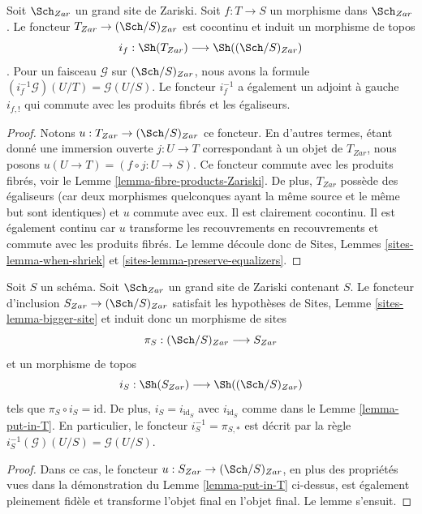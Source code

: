 \begin{lemma}
\label{lemma-put-in-T}
Soit $\Sch_{Zar}$ un grand site de Zariski. Soit $f : T \to S$ un morphisme dans $\Sch_{Zar}$. Le foncteur $T_{Zar} \to (\Sch/S)_{Zar}$ est cocontinu et induit un morphisme de topos
$$
i_f :
\Sh(T_{Zar})
\longrightarrow
\Sh((\Sch/S)_{Zar})
$$
. Pour un faisceau $\mathcal{G}$ sur $(\Sch/S)_{Zar}$, nous avons la formule\newline $(i_f^{-1}\mathcal{G})(U/T) = \mathcal{G}(U/S)$. Le foncteur $i_f^{-1}$ a également un adjoint à gauche $i_{f, !}$ qui commute avec les produits fibrés et les égaliseurs.
\end{lemma}

\begin{proof}
Notons $u : T_{Zar} \to (\Sch/S)_{Zar}$ ce foncteur. En d'autres termes, étant donné une immersion ouverte $j : U \to T$ correspondant à un objet de $T_{Zar}$, nous posons $u(U \to T) = (f \circ j : U \to S)$. Ce foncteur commute avec les produits fibrés, voir le Lemme \ref{lemma-fibre-products-Zariski}. De plus, $T_{Zar}$ possède des égaliseurs (car deux morphismes quelconques ayant la même source et le même but sont identiques) et $u$ commute avec eux. Il est clairement cocontinu. Il est également continu car $u$ transforme les recouvrements en recouvrements et commute avec les produits fibrés. Le lemme découle donc de Sites, Lemmes \ref{sites-lemma-when-shriek} et \ref{sites-lemma-preserve-equalizers}.
\end{proof}

\begin{lemma}
\label{lemma-at-the-bottom}
Soit $S$ un schéma. Soit $\Sch_{Zar}$ un grand site de Zariski contenant $S$. Le foncteur d'inclusion $S_{Zar} \to (\Sch/S)_{Zar}$ satisfait les hypothèses de Sites, Lemme \ref{sites-lemma-bigger-site} et induit donc un morphisme de sites
$$
\pi_S : (\Sch/S)_{Zar} \longrightarrow S_{Zar}
$$
et un morphisme de topos
$$
i_S : \Sh(S_{Zar}) \longrightarrow \Sh((\Sch/S)_{Zar})
$$
tels que $\pi_S \circ i_S = \text{id}$. De plus, $i_S = i_{\text{id}_S}$ avec $i_{\text{id}_S}$ comme dans le Lemme \ref{lemma-put-in-T}. En particulier, le foncteur $i_S^{-1} = \pi_{S, *}$ est décrit par la règle $i_S^{-1}(\mathcal{G})(U/S) = \mathcal{G}(U/S)$.
\end{lemma}

\begin{proof}
Dans ce cas, le foncteur $u : S_{Zar} \to (\Sch/S)_{Zar}$, en plus des propriétés vues dans la démonstration du Lemme \ref{lemma-put-in-T} ci-dessus, est également pleinement fidèle et transforme l'objet final en l'objet final. Le lemme s'ensuit.
\end{proof}

